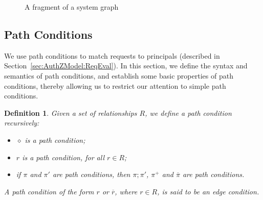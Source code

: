 \documentclass{article}
\newtheorem{definition}{Definition}
\newcommand{\comp}{\mathbin{;}}
\begin{document}
\begin{figure}[h]\centering
\caption{A fragment of a system graph}\label{img:system-graph-fragment}
\end{figure}



\subsection{Path Conditions}\label{sec:AuthZModel:PathConds}

We use path conditions to match requests to principals (described in Section~\ref{sec:AuthZModel:ReqEval}).
In this section, we define the syntax and semantics of path conditions, and establish some basic properties of path conditions, thereby allowing us to restrict our attention to simple path conditions.

\begin{definition}\label{def:path-condition}
   Given a set of relationships $R$, we define a \emph{path condition} recursively:
    \begin{itemize}
	\item $\diamond$ is a path condition;
        \item $r$ is a path condition, for all $r \in R$;
        \item if $\pi$ and $\pi'$ are path conditions, then $\pi \comp \pi'$, $\pi^+$ and $\overline{\pi}$ are path conditions.
    \end{itemize}
   A path condition of the form $r$ or $\overline{r}$, where $r \in R$, is said to be an \emph{edge condition}.
\end{definition}
\end{document}
